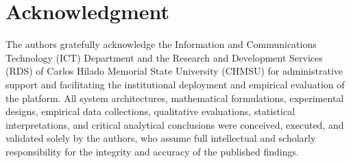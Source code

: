 \documentclass[conference]{IEEEtran}
\begin{document}
\section*{Acknowledgment}
The authors gratefully acknowledge the Information and Communications Technology (ICT) Department and the Research and Development Services (RDS) of Carlos Hilado Memorial State University (CHMSU) for administrative support and facilitating the institutional deployment and empirical evaluation of the platform. All system architectures, mathematical formulations, experimental designs, empirical data collections, qualitative evaluations, statistical interpretations, and critical analytical conclusions were conceived, executed, and validated solely by the authors, who assume full intellectual and scholarly responsibility for the integrity and accuracy of the published findings.
\end{document}
